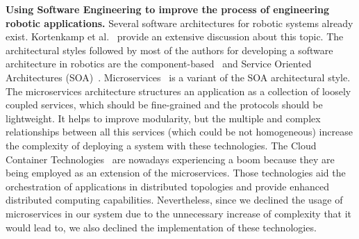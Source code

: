 \textbf{Using Software Engineering to improve the process of engineering robotic applications.}
Several software architectures for robotic systems already exist. 
Kortenkamp et al.~\cite{Kortenkamp2008} provide an extensive discussion about this topic. 
The architectural styles followed by most of the authors for developing a software architecture in robotics are the component-based~\cite{Bruyninckx2013,Brugali2012,braberman} and Service Oriented Architectures (SOA)~\cite{Fluckiger2014}.
Microservices~\cite{Newman2015} is a variant of the SOA architectural style. 
The microservices architecture structures an application as a collection of loosely coupled services, which should be fine-grained and the protocols should be lightweight. 
It helps to improve modularity, but the multiple and complex relationships between all this services (which could be not homogeneous) increase the complexity of deploying a system with these technologies. 
The Cloud Container Technologies~\cite{Pahl2017} are nowadays experiencing a boom because they are being employed as an extension of the microservices. 
Those technologies aid the orchestration of applications in distributed topologies and provide enhanced distributed computing capabilities. %
Nevertheless, since we declined the usage of microservices in our system due to the unnecessary increase of complexity that it would lead to, we also declined the implementation of these technologies. 

